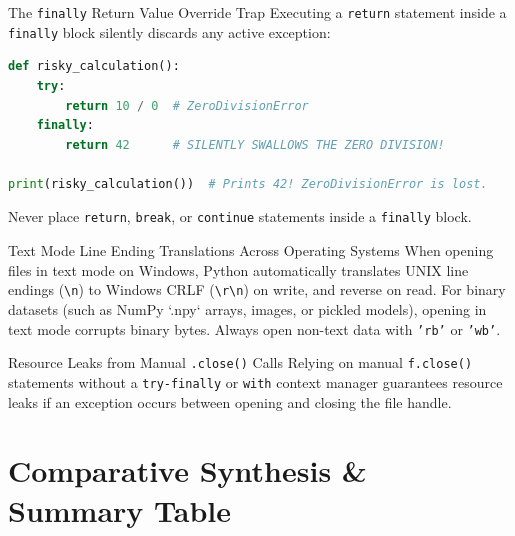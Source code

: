 \begin{trapbox}{The \texttt{finally} Return Value Override Trap}
Executing a \texttt{return} statement inside a \texttt{finally} block silently discards any active exception:
\begin{lstlisting}[language=Python]
def risky_calculation():
    try:
        return 10 / 0  # ZeroDivisionError
    finally:
        return 42      # SILENTLY SWALLOWS THE ZERO DIVISION!

print(risky_calculation())  # Prints 42! ZeroDivisionError is lost.
\end{lstlisting}
Never place \texttt{return}, \texttt{break}, or \texttt{continue} statements inside a \texttt{finally} block.
\end{trapbox}

\begin{trapbox}{Text Mode Line Ending Translations Across Operating Systems}
When opening files in text mode on Windows, Python automatically translates UNIX line endings (\texttt{\textbackslash n}) to Windows CRLF (\texttt{\textbackslash r\textbackslash n}) on write, and reverse on read. For binary datasets (such as NumPy `.npy` arrays, images, or pickled models), opening in text mode corrupts binary bytes. Always open non-text data with \texttt{'rb'} or \texttt{'wb'}.
\end{trapbox}

\begin{trapbox}{Resource Leaks from Manual \texttt{.close()} Calls}
Relying on manual \texttt{f.close()} statements without a \texttt{try-finally} or \texttt{with} context manager guarantees resource leaks if an exception occurs between opening and closing the file handle.
\end{trapbox}

\section{Comparative Synthesis \& Summary Table}

